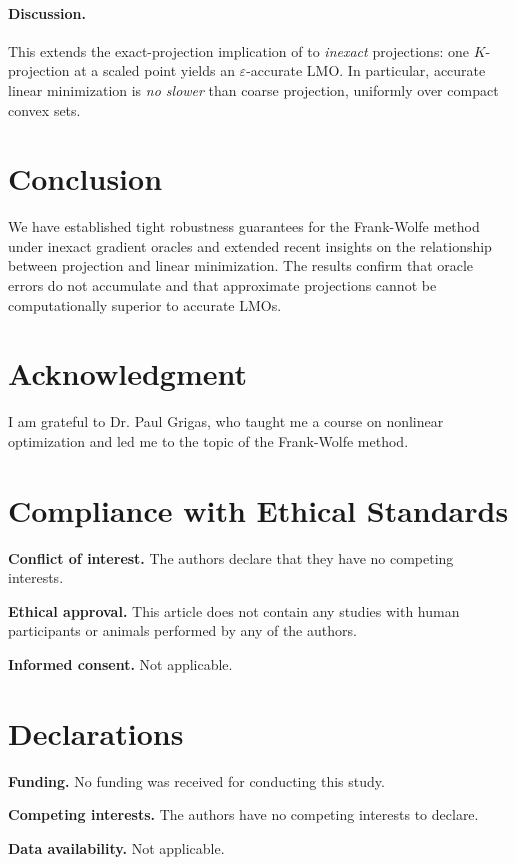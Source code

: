 \documentclass[smallextended]{svjour3}
\begin{document}
\paragraph{Discussion.}
This extends the exact-projection implication of \cite{Woodstock2025} to \emph{inexact} projections: one $K$-projection at a scaled point yields an $\varepsilon$-accurate LMO. In particular, accurate linear minimization is \emph{no slower} than coarse projection, uniformly over compact convex sets.

\section{Conclusion}
We have established tight robustness guarantees for the Frank-Wolfe method under inexact gradient oracles and extended recent insights on the relationship between projection and linear minimization. The results confirm that oracle errors do not accumulate and that approximate projections cannot be computationally superior to accurate LMOs.

\section{Acknowledgment}

I am grateful to Dr. Paul Grigas, who taught me a course on nonlinear optimization and led me to the topic of the Frank-Wolfe method.

\section{Compliance with Ethical Standards}

\textbf{Conflict of interest.} The authors declare that they have no competing interests.

\textbf{Ethical approval.} This article does not contain any studies with human participants or animals performed by any of the authors.

\textbf{Informed consent.} Not applicable.

\section{Declarations}

\textbf{Funding.} No funding was received for conducting this study.

\textbf{Competing interests.} The authors have no competing interests to declare.

\textbf{Data availability.} Not applicable.
\end{document}
